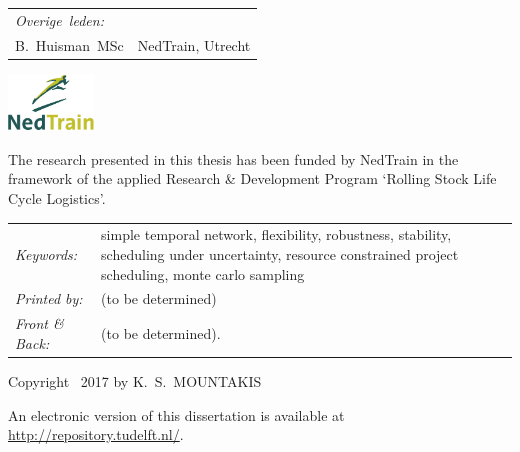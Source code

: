 \begin{titlepage}
\begin{tabular}{p{3cm}l}
    \medskip
    \mbox{\emph{Overige leden:}} & \\
    B.\ Huisman\ MSc & NedTrain, Utrecht \\
\end{tabular}


\vfill

\vspace{1.0cm}
\begin{minipage}[t]{0.25\textwidth}
\includegraphics[height=0.6in]{title/logos/nedtrain.pdf}
\end{minipage}
%
\begin{minipage}[b]{0.7\textwidth}
The research presented in this thesis has been funded by NedTrain in the framework of the applied Research \& Development Program `Rolling Stock Life Cycle Logistics'.
\end{minipage}
\vspace{1.0cm}

\vfill

\noindent
\begin{tabular}{@{}p{}@{}p{}}
	\textit{Keywords:} & {simple temporal network, flexibility, robustness, stability, scheduling under uncertainty, resource constrained project scheduling, monte carlo sampling} \\[\medskipamount]
	 \textit{Printed by:} & (to be determined) \\[\medskipamount]
	 \textit{Front \& Back:} & (to be determined).
\end{tabular}

\vspace{4\bigskipamount}

\noindent Copyright \textcopyright\ 2017 by K.~S.~MOUNTAKIS



\medskip
\noindent An electronic version of this dissertation is available at \\
\url{http://repository.tudelft.nl/}.

\end{titlepage}

